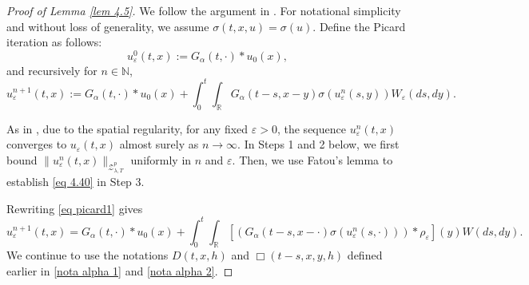 \documentclass[11pt,reqno]{amsart}
\numberwithin{equation}{section}
\newcommand{\1}{{\bf 1}}
\newcommand{\2}{{\bf 2}}
\begin{document}
  
\begin{proof}[Proof of Lemma \ref{lem 4.5}] 
We follow the   argument in \cite{HW2022}.  For notational simplicity   and  without loss of generality, we   assume $\sigma(t,x,u)=\sigma(u)$.  Define the Picard iteration as follows:
$$
u^0_{\varepsilon}(t,x):=G_{\alpha}(t,\cdot)*u_0(x),
$$
and recursively for $n\in \mathbb N$,
\begin{equation}\label{eq picard1}
u_{\varepsilon}^{n+1}(t, x):=G_{\alpha}(t,\cdot)*u_0(x)+\int_0^t\int_{\mathbb{R}}G_{\alpha}(t-s,x-y)\sigma\left(u_{\varepsilon}^n(s,y)\right)W_{\varepsilon}(ds,dy).
\end{equation}

As in \cite{HHLNT2017}, due to the spatial regularity, for any fixed $\varepsilon>0$, 
 the sequence $u_{\varepsilon}^n(t,x)$ converges to $u_{\varepsilon}(t,x)$ almost surely as  $n\to\infty$.  In  Steps 1 and 2 below, we first bound $\|u_{\varepsilon}^n(t,x)\|_{\mathcal{Z}_{\lambda,T}^p}$ uniformly in $n$ and $\varepsilon$. Then,   we use Fatou's lemma to establish \eqref{eq 4.40} in Step 3.
 
 Rewriting \eqref{eq picard1} gives
    $$
    u_{\varepsilon}^{n+1}(t,x)=G_{\alpha}(t,\cdot)*u_0(x)+\int_0^t\int_{\mathbb{R}}\left[\left(G_{\alpha}(t-s,x-\cdot)\sigma\left(u_{\varepsilon}^n(s,\cdot)\right)\right)*\rho_{\varepsilon}\right](y)W(ds,dy).
    $$
We  continue to use the notations $D(t,x,h)$ and $\Box(t-s,x,y,h)$ defined earlier  in \eqref{nota alpha  1} and \eqref{nota alpha 2}. 


\end{proof}
\end{document}
